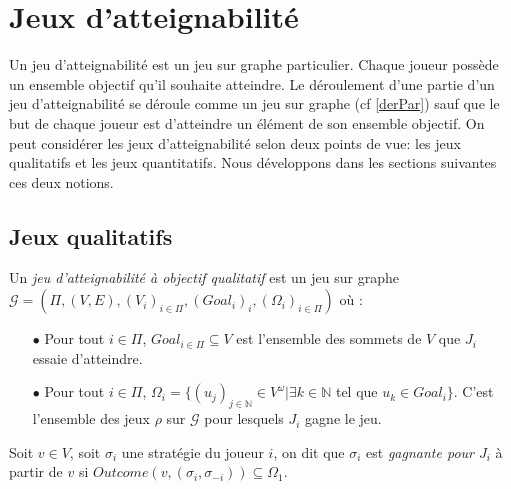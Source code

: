 
\section{Jeux d'atteignabilité}

Un jeu d'atteignabilité est un jeu sur graphe particulier. Chaque joueur possède un ensemble objectif qu'il souhaite atteindre. Le déroulement d'une partie d'un jeu d'atteignabilité se déroule comme un jeu sur graphe (cf \ref{derPar}) sauf que le but de chaque joueur est d'atteindre un élément de son ensemble objectif. On peut considérer les jeux d'atteignabilité selon deux points de vue: les jeux qualitatifs et les jeux quantitatifs. Nous développons dans les sections suivantes ces deux notions.


\subsection{Jeux qualitatifs}
	
	\begin{defi}
		Un \textit{jeu d'atteignabilité à objectif qualitatif} est un jeu sur graphe $\mathcal{G} = (\Pi,(V,E),(V_{i})_{i \in \Pi}, (Goal_{i})_{i},(\Omega _{i})_{i \in \Pi})$ où :
		\begin{enumerate}
			\item[$\bullet$] Pour tout $i \in \Pi$, $Goal_{i\in \Pi} \subseteq V $ est l'ensemble des sommets de $V$ que $J_{i}$ essaie d'atteindre.
			\item[$\bullet$] Pour tout $i \in \Pi$, $\Omega _{i} = \{(u_{j})_{j \in \mathbb{N}}\in V^{\omega}| \exists k \in \mathbb{N}$  tel que $u_{k}\in Goal_{i}\}$. C'est l'ensemble des jeux $\rho$ sur $\mathcal{G}$ pour lesquels $J_{i}$ gagne le jeu.
		\end{enumerate}	
	\end{defi}
	
	\label{strategieGagnante}
	\begin{defi}
		Soit $v \in V$, soit $\sigma _{i}$ une stratégie du joueur $i$, on dit que $\sigma _{i}$ est \textit{gagnante pour $J_{i}$} à partir de $v$ si $Outcome(v,(\sigma _{i}, \sigma _{-i})) \subseteq \Omega _{1}$.
	\end{defi}
	
